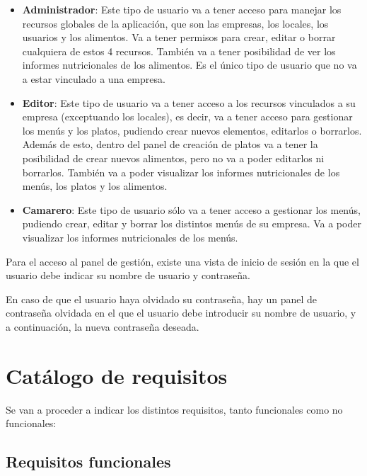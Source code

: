 \begin{itemize}
	\item \textbf{Administrador}: Este tipo de usuario va a tener acceso para manejar los recursos globales de la aplicación, que son las empresas, los locales, los usuarios y los alimentos. Va a tener permisos para crear, editar o borrar cualquiera de estos 4 recursos. También va a tener posibilidad de ver los informes nutricionales de los alimentos. Es el único tipo de usuario que no va a estar vinculado a una empresa. 
	\item \textbf{Editor}: Este tipo de usuario va a tener acceso a los recursos vinculados a su empresa (exceptuando los locales), es decir, va a tener acceso para gestionar los menús y los platos, pudiendo crear nuevos elementos, editarlos o borrarlos. Además de esto, dentro del panel de creación de platos va a tener la posibilidad de crear nuevos alimentos, pero no va a poder editarlos ni borrarlos. También va a poder visualizar los informes nutricionales de los menús, los platos y los alimentos.
	\item \textbf{Camarero}: Este tipo de usuario sólo va a tener acceso a gestionar los menús, pudiendo crear, editar y borrar los distintos menús de su empresa. Va a poder visualizar los informes nutricionales de los menús.
\end{itemize}

Para el acceso al panel de gestión, existe una vista de inicio de sesión en la que el usuario debe indicar su nombre de usuario y contraseña. 

En caso de que el usuario haya olvidado su contraseña, hay un panel de contraseña olvidada en el que el usuario debe introducir su nombre de usuario, y a continuación, la nueva contraseña deseada.


\section{Catálogo de requisitos}

Se van a proceder a indicar los distintos requisitos, tanto funcionales como no funcionales:

\subsection{Requisitos funcionales}

